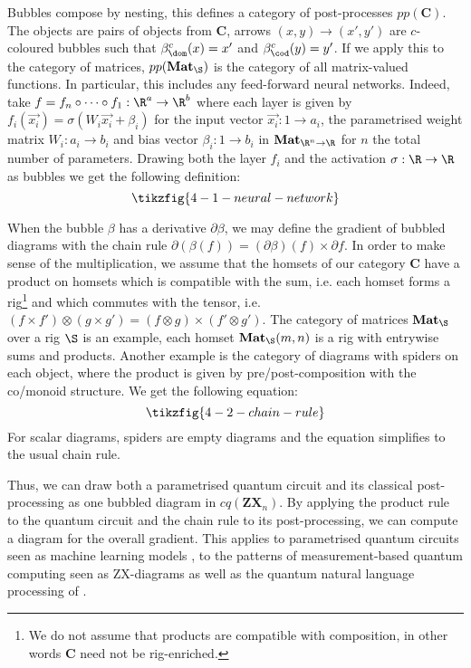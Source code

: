 Bubbles compose by nesting, this defines a category of post-processes
$pp(\mathbf{C})$. The objects are pairs of objects from $\mathbf{C}$, arrows
$(x, y) \to (x', y')$ are $c$-coloured bubbles such that
$\beta^c_\dom(x) = x'$ and $\beta^c_\cod(y) = y'$.
If we apply this to the category of matrices, $pp(\mathbf{Mat}_\S)$ is the
category of all matrix-valued functions. In particular, this includes
any feed-forward neural networks. Indeed, take
$f = f_n \circ \dots \circ f_1 : \R^a \to \R^b$
where each layer is given by $f_i(\vec{x_i}) = \sigma(W_i \vec{x_i} + \beta_i)$
for the input vector $\vec{x_i} : 1 \to a_i$,
the parametrised weight matrix $W_i : a_i \to b_i$
and bias vector $\beta_i : 1 \to b_i$ in $\mathbf{Mat}_{\R^n \to \R}$
for $n$ the total number of parameters.
Drawing both the layer $f_i$ and the activation $\sigma : \R \to \R$ as bubbles
we get the following definition:
$$\tikzfig{4-1-neural-network}$$

When the bubble $\beta$ has a derivative $\partial \beta$, we may define the
gradient of bubbled diagrams with the chain rule
$\partial(\beta(f)) = (\partial \beta)(f) \times \partial f$.
In order to make sense of the multiplication, we assume that the homsets of our
category $\mathbf{C}$ have a product on homsets which is compatible with the
sum, i.e. each homset forms a rig\footnote{
We do not assume that products are compatible with composition,
in other words $\mathbf{C}$ need not be rig-enriched.}
and which commutes with the tensor,
i.e. $(f \times f') \otimes (g \times g')
= (f \otimes g) \times (f' \otimes g')$.
The category of matrices $\mathbf{Mat}_\S$ over a rig $\S$ is an example, each
homset $\mathbf{Mat}_\S(m, n)$ is a rig with entrywise sums and products.
Another example is the category of diagrams with spiders on each object, where
the product is given by pre/post-composition with the co/monoid structure.
We get the following equation:
$$\tikzfig{4-2-chain-rule}$$
For scalar diagrams, spiders are empty diagrams and the
equation simplifies to the usual chain rule.

Thus, we can draw both a parametrised quantum circuit and its classical
post-processing as one bubbled diagram in $cq(\mathbf{ZX}_n)$. By applying the
product rule to the quantum circuit and the chain rule to its post-processing,
we can compute a diagram for the overall gradient. This applies to
parametrised quantum circuits seen as machine learning models
\cite{BenedettiEtAl19}, to the patterns of measurement-based quantum
computing seen as ZX-diagrams \cite{DuncanPerdrix10} as well as the quantum
natural language processing of \cite{MeichanetzidisEtAl20a}.
